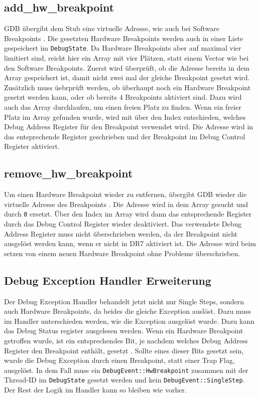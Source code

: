 \subsection{add\_hw\_breakpoint}
GDB übergibt dem Stub eine virtuelle Adresse, wie auch bei Software Breakpoints \cite{gdbstub}. Die gesetzten Hardware Breakpoints werden auch in einer Liste gespeichert im \texttt{DebugState}. Da Hardware Breakpoints aber auf maximal vier limitiert sind, reicht hier ein Array mit vier Plätzen, statt einem Vector wie bei den Software Breakpoints. Zuerst wird überprüft, ob die Adresse bereits in dem Array gespeichert ist, damit nicht zwei mal der gleiche Breakpoint gesetzt wird. Zusätzlich muss üebrprüft werden, ob überhaupt noch ein Hardware Breakpoint gesetzt werden kann, oder ob bereits 4 Breakpoints aktiviert sind. Dazu wird auch das Array durchlaufen, um einen freien Platz zu finden. Wenn ein freier Platz im Array gefunden wurde, wird mit über den Index entschieden, welches Debug Address Register für den Breakpoint verwendet wird. Die Adresse wird in das entsprechende Register geschrieben und der Breakpoint im Debug Control Register aktiviert. 

\subsection{remove\_hw\_breakpoint}
Um einen Hardware Breakpoint wieder zu entfernen, übergibt GDB wieder die virtuelle Adresse des Breakpoints \cite{gdbstub}. Die Adresse wird in dem Array gesucht und durch \texttt{0} ersetzt. Über den Index im Array wird dann das entsprechende Register durch das Debug Control Register wieder deaktiviert. Das verwendete Debug Address Register muss nicht überschrieben werden, da der Breakpoint nicht ausgelöst werden kann, wenn er nicht in DR7 aktiviert ist. Die Adresse wird beim setzen von einem neuen Hardware Breakpoint ohne Probleme überschrieben.

\subsection{Debug Exception Handler Erweiterung}
Der Debug Exception Handler behandelt jetzt nicht nur Single Steps, sondern auch Hardware Breakpoints, da beides die gleiche Exception auslöst. Dazu muss im Handler unterschieden werden, wie die Exception ausgelöst wurde. Dazu kann das Debug Status register ausgelesen werden. Wenn ein Hardware Breakpoint getroffen wurde, ist ein entsprechendes Bit, je nachdem welches Debug Address Register den Breakpoint enthält, gesetzt  \cite{intel-sdm}. Sollte eines dieser Bits gesetzt sein, wurde die Debug Exception durch einen Breakpoint, statt einer Trap Flag, ausgelöst. In dem Fall muss ein \texttt{DebugEvent::HwBreakpoint} zusammen mit der Thread-ID im \texttt{DebugState} gesetzt werden und kein \texttt{DebugEvent::SingleStep}. Der Rest der Logik im Handler kann so bleiben wie vorher.